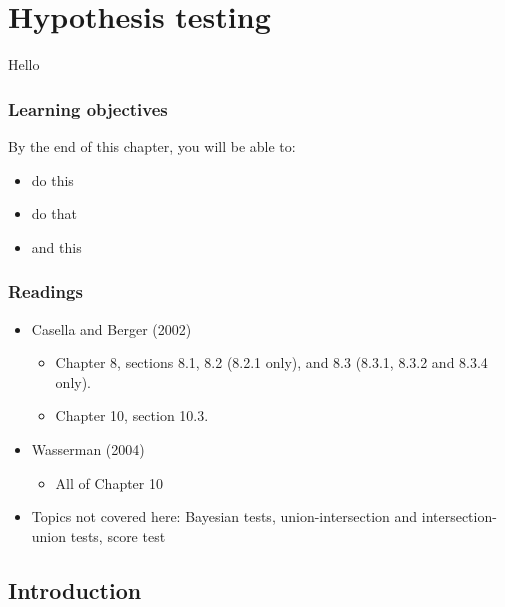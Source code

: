 \documentclass[
]{book}
\providecommand{\tightlist}{%
  \setlength{\itemsep}{0pt}\setlength{\parskip}{0pt}}
\theoremstyle{definition}
\theoremstyle{definition}
\theoremstyle{definition}
\theoremstyle{definition}
\theoremstyle{remark}
\begin{document}
\hypertarget{hypothesis-testing}{%
\chapter{Hypothesis testing}\label{hypothesis-testing}}

Hello

\hypertarget{learning-objectives-4}{%
\subsection*{Learning objectives}\label{learning-objectives-4}}

By the end of this chapter, you will be able to:

\begin{itemize}
\tightlist
\item
  do this
\item
  do that
\item
  and this
\end{itemize}

\hypertarget{readings-4}{%
\subsection*{Readings}\label{readings-4}}

\begin{itemize}
\tightlist
\item
  Casella and Berger (2002)

  \begin{itemize}
  \tightlist
  \item
    Chapter 8, sections 8.1, 8.2 (8.2.1 only), and 8.3 (8.3.1, 8.3.2 and 8.3.4 only).
  \item
    Chapter 10, section 10.3.
  \end{itemize}
\item
  Wasserman (2004)

  \begin{itemize}
  \tightlist
  \item
    All of Chapter 10
  \end{itemize}
\item
  Topics not covered here: Bayesian tests, union-intersection and intersection-union tests, score test
\end{itemize}

\hypertarget{introduction-2}{%
\section{Introduction}\label{introduction-2}}
\end{document}
